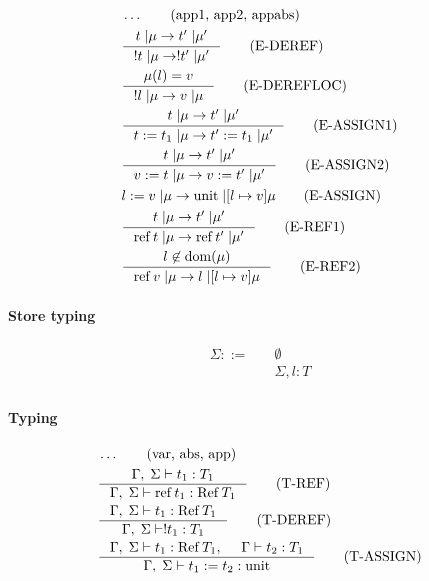 \documentclass{article}
\newcommand{\typjud}[2]{\Gamma \vdash #1: #2}
\newcommand{\typjudr}[2]{\Gamma,\; \Sigma \vdash #1: #2}
\newcommand{\mref}{\mathrm{ref}\, }
\newcommand{\mRef}{\mathrm{Ref}\, }
\newcommand{\munit}{\text{unit}}
\newcommand{\dom}{\mathrm{dom}}
\begin{document}
  \begin{align*}
    & \ldots
      \tag{app1, app2, appabs} \\
    & \inference
      {t \;| \mu \to t' \;| \mu'}
      {!t \;| \mu \to !t' \;| \mu'}
      \tag{E-DEREF}\\
    & \inference
      {\mu(l) = v}
      {!l \;| \mu \to v \;| \mu}
      \tag{E-DEREFLOC}\\
    & \inference
      {t \;| \mu \to t' \;| \mu'}
      {t := t_1 \;| \mu \to t' := t_1 \;| \mu'}
      \tag{E-ASSIGN1}\\
    & \inference
      {t \;| \mu \to t' \;| \mu'}
      {v := t \;| \mu \to v := t' \;| \mu'}
      \tag{E-ASSIGN2}\\
    & l := v \;| \mu \to \munit \;| [l\mapsto v]\mu
      \tag{E-ASSIGN}\\
    & \inference
      {t \;| \mu \to t' \;| \mu'}
      {\mref t \;| \mu \to \mref t' \;| \mu'}
      \tag{E-REF1}\\
    & \inference
      {l \not\in \dom(\mu)}
      {\mref v \;| \mu \to l \;| [l \mapsto v]\mu}
      \tag{E-REF2}\\
  \end{align*}

\paragraph{Store typing}
  \begin{align*}
    \Sigma ::= \quad & \emptyset \\
      & \Sigma, l: T\\
  \end{align*}

\paragraph{Typing}
  \begin{align*}
    & \ldots
      \tag{var, abs, app}\\
    & \inference
      {\typjudr{t_1}{T_1}}
      {\typjudr{\mref t_1}{\mRef T_1}}
      \tag{T-REF}\\
    & \inference
      {\typjudr{t_1}{\mRef T_1}}
      {\typjudr{! t_1}{T_1}}
      \tag{T-DEREF}\\
    & \inference
      {\typjudr{t_1}{\mRef T_1},& \typjud{t_2}{T_1}}
      {\typjudr{t_1 := t_2}{\munit}}
      \tag{T-ASSIGN}\\
  \end{align*}
\end{document}
